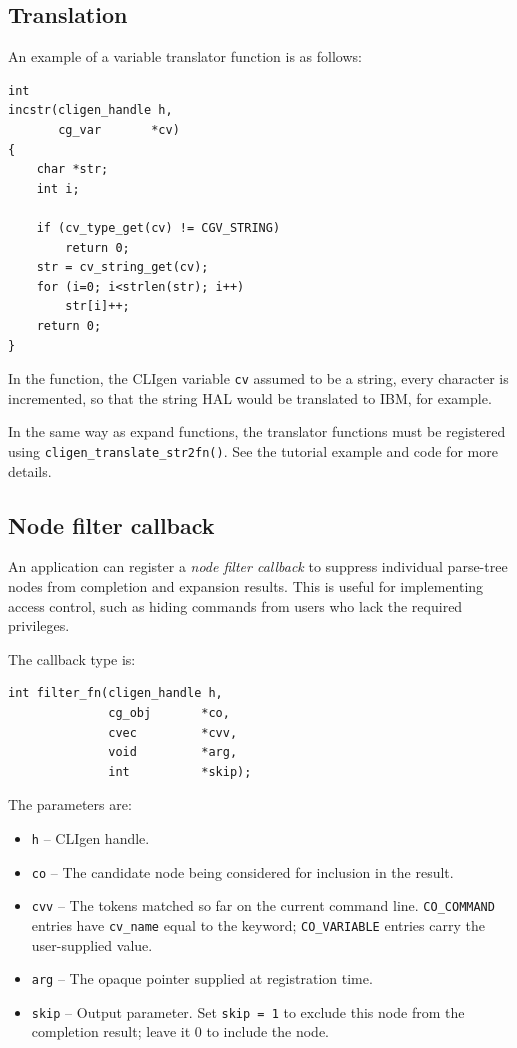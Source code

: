 \documentclass[a4paper, 10pt] {article}
\begin{document}
\subsection{Translation}
\label{sec:translate}

An example of a variable translator function is as follows:
\begin{verbatim}
int
incstr(cligen_handle h,
       cg_var       *cv)
{
    char *str;
    int i;
    
    if (cv_type_get(cv) != CGV_STRING)
        return 0;
    str = cv_string_get(cv);
    for (i=0; i<strlen(str); i++)
        str[i]++;
    return 0;
}
\end{verbatim}

In the function, the CLIgen variable {\tt cv} assumed to be a string, every character is incremented, so that the string HAL would be translated to IBM, for example.

In the same way as expand functions, the translator functions must be registered using {\tt cligen\_translate\_str2fn()}. See the tutorial example and code for more details.

\subsection{Node filter callback}
\label{sec:node-filter}

An application can register a \emph{node filter callback} to suppress individual
parse-tree nodes from completion and expansion results. This is useful for
implementing access control, such as hiding commands from users who lack the
required privileges.

The callback type is:
\begin{verbatim}
int filter_fn(cligen_handle h,
              cg_obj       *co,
              cvec         *cvv,
              void         *arg,
              int          *skip);
\end{verbatim}

The parameters are:
\begin{itemize}
\item {\tt h} -- CLIgen handle.
\item {\tt co} -- The candidate node being considered for inclusion in the
  result.
\item {\tt cvv} -- The tokens matched so far on the current command line.
  {\tt CO\_COMMAND} entries have {\tt cv\_name} equal to the keyword;
  {\tt CO\_VARIABLE} entries carry the user-supplied value.
\item {\tt arg} -- The opaque pointer supplied at registration time.
\item {\tt skip} -- Output parameter. Set {\tt *skip = 1} to exclude this node
  from the completion result; leave it 0 to include the node.
\end{itemize}
\end{document}
